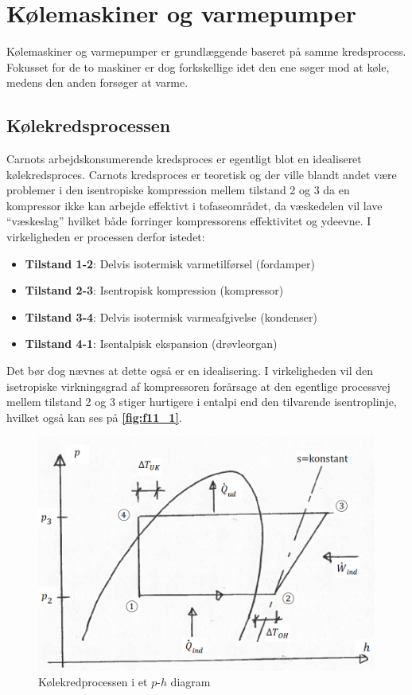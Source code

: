 
\section{Kølemaskiner og varmepumper}
Kølemaskiner og varmepumper er grundlæggende baseret på samme kredsprocess. Fokusset for de to maskiner er dog forkskellige idet den ene søger mod at køle, medens den anden forsøger at varme.

\subsection{Kølekredsprocessen}
Carnots arbejdskonsumerende kredsproces er egentligt blot en idealiseret kølekredsproces. Carnots kredsproces er teoretisk og der ville blandt andet være problemer i den isentropiske kompression mellem tilstand 2 og 3 da en kompressor ikke kan arbejde effektivt i tofaseområdet, da væskedelen vil lave ``væskeslag'' hvilket både forringer kompressorens effektivitet og ydeevne. I virkeligheden er processen derfor istedet:
\begin{itemize}
  \item \textbf{Tilstand 1-2}: Delvis isotermisk varmetilførsel (fordamper)
  \item \textbf{Tilstand 2-3}: Isentropisk kompression (kompressor)
  \item \textbf{Tilstand 3-4}: Delvis isotermisk varmeafgivelse (kondenser)
  \item \textbf{Tilstand 4-1}: Isentalpisk ekspansion (drøvleorgan)
\end{itemize}
Det bør dog nævnes at dette også er en idealisering. I virkeligheden vil den isetropiske virkningsgrad af kompressoren forårsage at den egentlige processvej mellem tilstand 2 og 3 stiger hurtigere i entalpi end den tilvarende isentroplinje, hvilket også kan ses på \textbf{\autoref{fig:f11_1}}.

\begin{figure} [ht]
  \centering
  \includegraphics[width=0.5\linewidth]{./figures/f11_1.png}
  \caption{Kølekredprocessen i et $p$-$h$ diagram}
  \label{fig:f11_1}
\end{figure}

